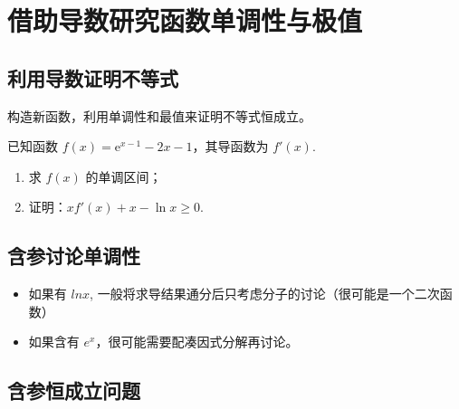 \section{借助导数研究函数单调性与极值}

\subsection{利用导数证明不等式}

\begin{theorem}[利用导数证明不等式]
    构造新函数，利用单调性和最值来证明不等式恒成立。
\end{theorem}
\begin{example}
    已知函数 $f(x) = \mathrm{e}^{x - 1} - 2x - 1$，其导函数为 $f'(x)$.
    \begin{enumerate}
        \item[(1)] 求 $f(x)$ 的单调区间；
        \item[(2)] 证明：$xf'(x) + x - \ln x \geq 0$.
    \end{enumerate}
\end{example}

\vspace{4em}

\subsection{含参讨论单调性}

\begin{theorem}[含参讨论单调性]
    \begin{itemize}
        \item 如果有 $lnx$, 一般将求导结果通分后只考虑分子的讨论（很可能是一个二次函数）
        \item 如果含有 $e^x$，很可能需要配凑因式分解再讨论。
    \end{itemize}
\end{theorem}

\vspace{4em}

\subsection{含参恒成立问题}

